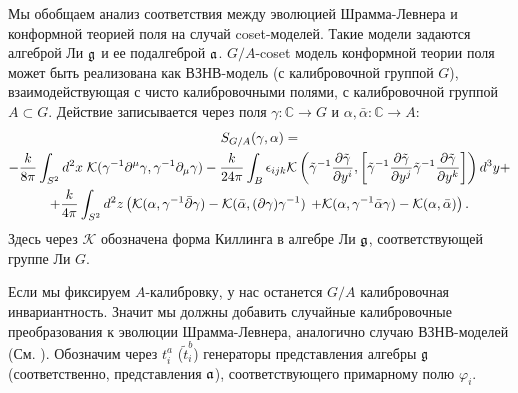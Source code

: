 \documentclass[14pt,autoref,href,facsimile
]{disser}
\begin{document}
Мы обобщаем анализ соответствия между эволюцией Шрамма-Левнера и конформной теорией поля на случай coset-моделей. Такие модели задаются алгеброй Ли $\mathfrak{g}$ и ее подалгеброй $\mathfrak{a}$. 
$G/A$-coset модель конформной теории поля может быть реализована как ВЗНВ-модель (с калибровочной группой $G$), взаимодействующая с чисто калибровочными полями, с калибровочной группой $A\subset G$. Действие записывается через поля $\gamma:\mathbb{C}\to G$ и $\alpha,\bar\alpha:\mathbb{C}\to A$:
\begin{multline}
\label{eq:178}
      S_{G/A}(\gamma, \alpha)=\\
-\frac{k}{8\pi}\int_{S^2} d^2x\; {\cal K} (\gamma^{-1}\partial^{\mu}\gamma,\gamma^{-1}\partial_{\mu}\gamma)-
 \frac{k }{24\pi} \int_{B}\epsilon_{ijk} {\cal K}\left(
    \tilde \gamma^{-1}\frac{\partial \tilde \gamma}{\partial y^i},
      \left[\tilde \gamma^{-1}\frac{\partial \tilde \gamma}{\partial y^j}
      \tilde \gamma^{-1}\frac{\partial \tilde \gamma}{\partial y^k}\right]\right) d^3y+\\
+
      \frac{k}{4\pi}\int_{S^2} d^{2}z \left(\mathcal{K}(\alpha, \gamma^{-1}\bar \partial \gamma)-\mathcal{K}(\bar \alpha, (\partial \gamma ) \gamma^{-1})\right.
      \left.+\mathcal{K}(\alpha,\gamma^{-1}\bar \alpha \gamma)-\mathcal{K}(\alpha,\bar \alpha)\right).
\end{multline}
Здесь через  $\mathcal{K}$ обозначена форма Киллинга в алгебре Ли $\mathfrak{g}$, соответствующей группе Ли $G$.

Если мы фиксируем  $A$-калибровку, у нас останется  $G/A$ калибровочная инвариантность. Значит мы должны добавить случайные калибровочные преобразования к эволюции Шрамма-Левнера, аналогично случаю ВЗНВ-моделей  (См. \cite{bettelheim2005stochastic}).  Обозначим через $t^{a}_{i}$ ($\tilde{t}^{b}_{i}$) генераторы представления алгебры $\mathfrak{g}$ (соответственно, представления $\mathfrak{a}$), соответствующего примарному полю $\varphi_{i}$.
\end{document}
